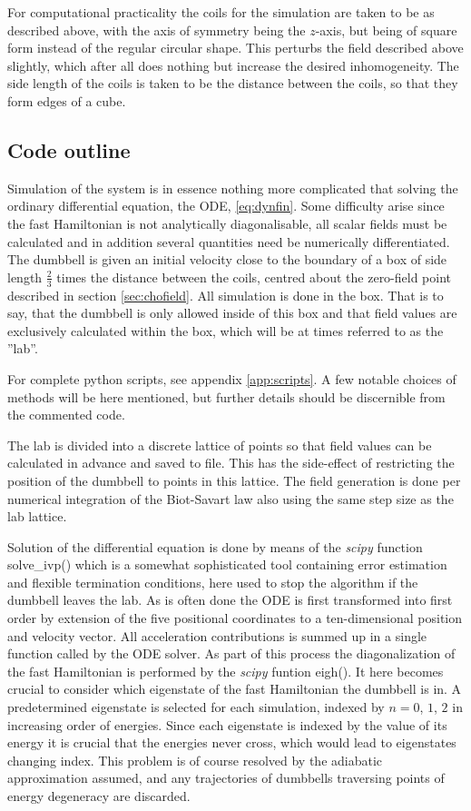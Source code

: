 \documentclass[main.tex]{subfiles}
\begin{document}
For computational practicality the coils for the simulation are taken to be as described
above, with the axis of symmetry being the \(z\)-axis, but being of square form instead of
the regular circular shape. This perturbs the field described above slightly, which after
all does nothing but increase the desired inhomogeneity. The side length of the coils is
taken to be the distance between the coils, so that they form edges of a cube.

\subsection{Code outline}
Simulation of the system is in essence nothing more complicated that solving the
ordinary differential equation, the ODE, \ref{eq:dynfin}. Some difficulty arise since the fast
Hamiltonian is not analytically diagonalisable, all scalar fields must be calculated and in
addition several quantities need be numerically differentiated. The dumbbell is given an
initial velocity close to the boundary of a box of side length \(\frac{2}{3}\) times the
distance between the coils, centred about the zero-field point described in section
\ref{sec:chofield}. All simulation is done in the box. That is to say, that the dumbbell is
only allowed inside of this box and that field values are exclusively calculated within the
box, which will be at times referred to as the ''lab''.

For complete python scripts, see appendix \ref{app:scripts}. A few notable choices of
methods will be here mentioned, but further details should be discernible from the
commented code.

The lab is divided into a discrete lattice of points so that field values can be
calculated in advance and saved to file. This has the side-effect of restricting the
position of the dumbbell to points in this lattice. The field generation is done per numerical
integration of the Biot-Savart law also using the same step size as the lab lattice.

Solution of the differential equation is done by means of the \textit{scipy} function
solve\_ivp() which is a somewhat sophisticated tool containing error estimation and
flexible termination conditions, here used to stop the algorithm if the dumbbell leaves the
lab. As is often done the ODE is first transformed into first order by extension of the
five positional coordinates to a ten-dimensional position and velocity vector. All
acceleration contributions is summed up in a single function called by the ODE solver. 
As part of this process the diagonalization of the fast Hamiltonian is performed by the
\textit{scipy} funtion eigh(). It here becomes crucial to consider which eigenstate of the
fast Hamiltonian the dumbbell is in. A predetermined eigenstate is selected for each
simulation, indexed by \(n = 0\), \(1\), \(2\) in increasing order of energies. Since each
eigenstate is indexed by the value of its energy it is crucial that the energies never
cross, which would lead to eigenstates changing index. This problem is of course resolved
by the adiabatic approximation assumed, and any trajectories of dumbbells traversing points
of energy degeneracy are discarded.
\end{document}
